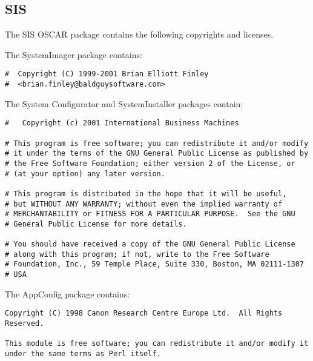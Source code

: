 %
%
% 
% 
% 
% 
%

\subsection{SIS}
The SIS OSCAR package contains the following copyrights and licenses.

The SystemImager package contains:

\begin{verbatim}
#  Copyright (C) 1999-2001 Brian Elliott Finley 
#  <brian.finley@baldguysoftware.com>
\end{verbatim}

The System Configurator and SystemInstaller packages contain:

\begin{verbatim}
#   Copyright (c) 2001 International Business Machines

# This program is free software; you can redistribute it and/or modify
# it under the terms of the GNU General Public License as published by
# the Free Software Foundation; either version 2 of the License, or 
# (at your option) any later version.

# This program is distributed in the hope that it will be useful,
# but WITHOUT ANY WARRANTY; without even the implied warranty of 
# MERCHANTABILITY or FITNESS FOR A PARTICULAR PURPOSE.  See the GNU
# General Public License for more details.

# You should have received a copy of the GNU General Public License
# along with this program; if not, write to the Free Software 
# Foundation, Inc., 59 Temple Place, Suite 330, Boston, MA 02111-1307
# USA
\end{verbatim}

The AppConfig package contains:

\begin{verbatim}
Copyright (C) 1998 Canon Research Centre Europe Ltd.  All Rights
Reserved. 

This module is free software; you can redistribute it and/or modify it 
under the same terms as Perl itself.
\end{verbatim}

